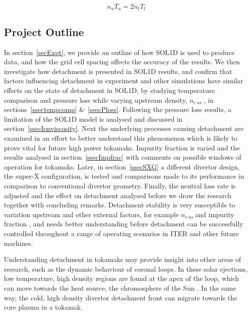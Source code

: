 \documentclass[12pt]{article}  %
\providecommand{\neus}{$n_{e~us}~$} %
\begin{document}
  \begin{equation}\label{eqPus_tg}
  n_uT_u = 2n_tT_t
  \end{equation}

\subsection{Project Outline}\label{ssecOutline}
In section~\ref{secExpt}, we provide an outline of how SOL1D is used to produce data, and how the grid cell spacing affects the accuracy of the results. We then investigate how detachment is presented in SOL1D results, and confirm that factors influencing detachment in experiment and other simulations have similar effects on the state of detachment in SOL1D, by studying temperature comparison and pressure loss while varying upstream density, \neus, in sections~\ref{ssectempcomp} \&~\ref{ssecPloss}. Following the pressure loss results, a limitation of the SOL1D model is analysed and discussed in section~\ref{ssecIonviscosity}.  Next the underlying processes causing detachment are examined in an effort to better understand this phenomenon which is likely to prove vital for future high power tokamaks. Impurity fraction is varied and the results analysed in section~\ref{ssecImpfrac} with comments on possible windows of operation for tokamaks. Later, in section~\ref{ssecSXG} a different divertor design, the super-X configuration, is tested and comparisons made to its performance in comparison to conventional divertor geometry. Finally, the neutral loss rate is adjusted and the effect on detachment analysed before we draw the research together with concluding remarks. Detachment stability is very susceptible to variation upstream and other external factors, for example \neus and impurity fraction \cite{Lipschultz2016}, and needs better understanding before detachment can be successfully controlled throughout a range of operating scenarios in ITER and other future machines. 

Understanding detachment in tokamaks may provide insight into other areas of research, such as the dynamic behaviour of coronal loops. In these solar ejections, low temperature, high density regions are found at the apex of the loop, which can move towards the heat source, the chromosphere of the Sun \cite{Muller2004}. In the same way, the cold, high density divertor detachment front can migrate towards the core plasma in a tokamak.
\end{document}
